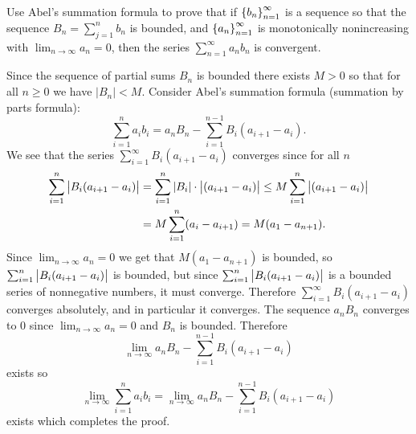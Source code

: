 \documentclass[11pt,a4paper]{article}
\begin{document}
\begin{exercise}
 Use Abel's summation formula to prove that if $\left\{b_n\right\}_{n=1}^{\infty}$ is
 a sequence so that the sequence $B_n = \sum_{j=1}^{n} b_n$ is bounded,
 and $\left\{a_n\right\}_{n=1}^{\infty}$ is monotonically nonincreasing with
 $\lim_{n \to \infty} a_n = 0$, then the series
 $\sum_{n=1}^{\infty} a_n b_n$ is convergent.
\end{exercise}
\begin{solution}
  Since the sequence of partial sums $B_n$ is bounded there exists $M > 0$
  so that for all $n \geq 0$ we have $|B_n| < M$.
  Consider Abel's summation formula (summation by parts formula):
  \[
    \sum_{i=1}^{n} a_i b_i =
    a_n B_n - \sum_{i=1}^{n-1} B_i (a_{i+1} - a_i).
  \]
  We see that the series $\sum_{i=1}^{\infty} B_i (a_{i+1} - a_i)$
  converges since for all $n$
  \begin{align*}
    \sum_{i=1}^{n} \left\lvert B_i (a_{i+1} - a_i)\right\rvert &=
    \sum_{i=1}^{n} \left\lvert B_i\right\rvert \cdot \left\lvert(a_{i+1} - a_i)\right\rvert \le
    M \sum_{i=1}^{n} \left\lvert(a_{i+1} - a_i)\right\rvert \\ &=
    M \sum_{i=1}^{n} (a_{i} - a_{i+1}) = M (a_1 - a_{n + 1}).
  \end{align*}
  Since $\lim_{n \to \infty} a_n = 0$ we get that
  $M (a_1 - a_{n + 1})$ is bounded,
  so $\sum_{i=1}^{n} \left\lvert B_i (a_{i+1} - a_i)\right\rvert$ is bounded,
  but since $\sum_{i=1}^{n} \left\lvert B_i (a_{i+1} - a_i)\right\rvert$
  is a bounded series of nonnegative numbers, it must converge.
  Therefore $\sum_{i=1}^{\infty} B_i (a_{i+1} - a_i)$ converges
  absolutely, and in particular it converges.
  The sequence $a_n B_n$ converges to $0$ since $\lim_{n \to \infty} a_n = 0$
  and $B_n$ is bounded.
  Therefore
  \[
    \lim_{n \to \infty} a_n B_n - \sum_{i=1}^{n-1} B_i (a_{i+1} - a_i)
  \]
  exists so
  \[
    \lim_{n \to \infty} \sum_{i=1}^{n} a_i b_i =
    \lim_{n \to \infty} a_n B_n - \sum_{i=1}^{n-1} B_i (a_{i+1} - a_i)
  \]
  exists which completes the proof.
\end{solution}
\end{document}
